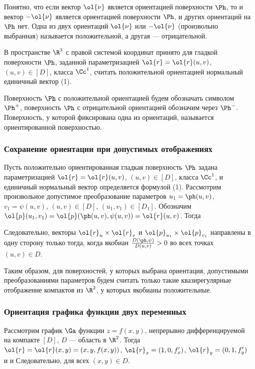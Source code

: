 \documentclass[a4paper]{article}
\begin{document}
Понятно, что если вектор $\ol{\nu}$ является ориентацией поверхности
$\Ph$, то и вектор $-\ol{\nu}$ является ориентацией поверхности
$\Ph$, и других ориентаций на $\Ph$ нет. Одна из двух ориентаций
$\ol{\nu}$ или $-\ol{\nu}$ (произвольно выбранная) называется
положительной, а другая --- отрицательной.

В пространстве $\R^3$ с правой системой координат принято для
гладкой поверхности $\Ph$, заданной параметризацией
$\ol{r}=\ol{r}(u,v)$, $(u,v)\in[D]$, класса $\Cc^1$, считать
положительной ориентацией нормальный единичный вектор (1).

Поверхность $\Ph$ с положительной ориентацией будем обозначать
символом $\Ph^+$, поверхность $\Ph$ с отрицательной ориентацией
обозначим через $\Ph^-$. Поверхность, у которой фиксирована одна из
ориентаций, называется ориентированной поверхностью.

\subsubsection{Сохранение ориентации при допустимых отображениях}

Пусть положительно ориентированная гладкая поверхность $\Ph$ задана
параметризацией $\ol{r}=\ol{r}(u,v)$, $(u,v)\in[D]$, класса $\Cc^1$,
и единичный нормальный вектор определяется формулой (1). Рассмотрим
произвольное допустимое преобразование параметров $u_1=\ph(u,v)$,
$v_1=\psi(u,v)$, $(u,v)\in[D]$, $(u_1,v_1)\in[D_1]$. Обозначим
$\ol{p}(u_1,v_1)=\ol{p}(\ph(u,v),\psi(u,v)) = \ol{r}(u,v)$. Тогда

Следовательно, векторы $\ol{r}_u\times\ol{r}_v$ и
$\ol{p}_{u_1}\times\ol{p}_{v_1}$ направлены в одну сторону только
тогда, когда якобиан $\frac{D(\ph,\psi)}{D(u,v)}>0$ во всех точках
$(u,v)\in D$.

Таким образом, для поверхностей, у которых выбрана ориентация,
допустимыми преобразованиями параметров будем считать только такие
квазирегулярные отображение компактов из $\R^2$, у которых якобианы
положительные.

\subsubsection{Ориентация графика функции двух переменных}

Рассмотрим график $\Ga$ функции $z=f(x,y)$, непрерывно
дифференцируемой на компакте $[D]$, $D$ --- область в $\R^2$. Тогда
$\ol{r}=\ol{r}(x,y) = (x,y,f(x,y))$, $\ol{r}_x = (1,0,f'_x)$,
$\ol{r}_y=(0,1,f'_y)$ и  и
 Следовательно,
 для
всех $(x,y)\in D$.
\end{document}
